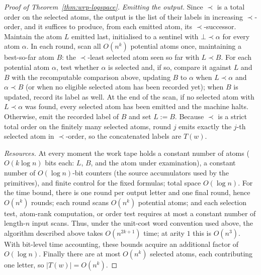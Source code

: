 \documentclass[11pt]{article}
\theoremstyle{definition}
\begin{document}
\begin{proof}[Proof of Theorem~\ref{thm:wrp-logspace}]
\vspace{0.5em}
\noindent\emph{Emitting the output.}
Since $\prec$ is a total order on the selected atoms, the output is the list
of their labels in increasing $\prec$-order, and it suffices to produce, from
each emitted atom, its $\prec$-successor.  Maintain the atom $L$ emitted last,
initialised to a sentinel with $\bot\prec\alpha$ for every atom $\alpha$.  In
each round, scan all $O(n^k)$ potential atoms once, maintaining a best-so-far
atom $B$: the $\prec$-least selected atom seen so far with $L\prec B$.  For
each potential atom $\alpha$, test whether $\alpha$ is selected and, if so,
compare it against $L$ and $B$ with the recomputable comparison above,
updating $B$ to $\alpha$ when $L\prec\alpha$ and $\alpha\prec B$ (or when no
eligible selected atom has been recorded yet); when $B$ is updated, record its
label as well.  At the end of the scan, if no selected atom with
$L\prec\alpha$ was found, every selected atom has been emitted and the machine
halts.  Otherwise, emit the recorded label of $B$ and set $L:=B$.  Because
$\prec$ is a strict total
order on the finitely many selected atoms, round $j$ emits exactly the
$j$-th selected atom in $\prec$-order, so the concatenated labels are $T(w)$.

\vspace{0.5em}
\noindent\emph{Resources.}
At every moment the work tape holds a constant number of atoms ($O(k\log n)$
bits each: $L$, $B$, and the atom under examination), a constant number of
$O(\log n)$-bit counters (the source accumulators used by the primitives), and
finite control for the fixed formulas; total space $O(\log n)$.  For the time
bound, there is one round per output letter and one final round, hence
$O(n^k)$ rounds; each round scans $O(n^k)$ potential atoms; and each selection
test, atom-rank computation, or order test requires at most a constant number
of length-$n$ input scans.  Thus, under the unit-cost word convention used
above, the algorithm described above takes $O(n^{2k+1})$ time; at arity $1$
this is $O(n^3)$.  With bit-level time accounting, these bounds acquire an
additional factor of $O(\log n)$.  Finally there are at most $O(n^k)$ selected
atoms, each contributing one letter, so $|T(w)|=O(n^k)$.
\end{proof}
\end{document}
